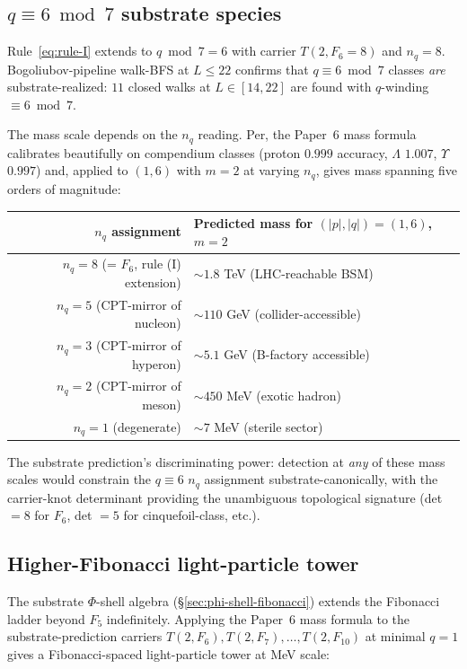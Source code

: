 \documentclass[11pt]{article}
\begin{document}
\subsection{$q \equiv 6 \bmod 7$ substrate species}
\label{sec:q6-species}

Rule~\eqref{eq:rule-I} extends to $q \bmod 7 = 6$ with carrier $T(2, F_6 = 8)$ and $n_q = 8$.  Bogoliubov-pipeline walk-BFS at $L \leq 22$ confirms that $q \equiv 6 \bmod 7$ classes \emph{are} substrate-realized: $11$ closed walks at $L \in [14, 22]$ are found with $q$-winding $\equiv 6 \bmod 7$.

The mass scale depends on the $n_q$ reading.  Per, the Paper~6 mass formula calibrates beautifully on compendium classes (proton $0.999$ accuracy, $\Lambda$ $1.007$, $\Upsilon$ $0.997$) and, applied to $(1, 6)$ with $m = 2$ at varying $n_q$, gives mass spanning five orders of magnitude:
\begin{center}
\begin{tabular}{rl}
\toprule
$n_q$ assignment & Predicted mass for $(|p|, |q|) = (1, 6)$, $m = 2$ \\
\midrule
$n_q = 8$ (= $F_6$, rule (I) extension) & $\sim 1.8$ TeV (LHC-reachable BSM) \\
$n_q = 5$ (CPT-mirror of nucleon)        & $\sim 110$ GeV (collider-accessible) \\
$n_q = 3$ (CPT-mirror of hyperon)        & $\sim 5.1$ GeV (B-factory accessible) \\
$n_q = 2$ (CPT-mirror of meson)          & $\sim 450$ MeV (exotic hadron) \\
$n_q = 1$ (degenerate)                   & $\sim 7$ MeV (sterile sector) \\
\bottomrule
\end{tabular}
\end{center}

The substrate prediction's discriminating power: detection at \emph{any} of these mass scales would constrain the $q \equiv 6$ $n_q$ assignment substrate-canonically, with the carrier-knot determinant providing the unambiguous topological signature (det $= 8$ for $F_6$, det $= 5$ for cinquefoil-class, etc.).

\subsection{Higher-Fibonacci light-particle tower}
\label{sec:fibonacci-tower}

The substrate $\Phi$-shell algebra (\S\ref{sec:phi-shell-fibonacci}) extends the Fibonacci ladder beyond $F_5$ indefinitely.  Applying the Paper~6 mass formula to the substrate-prediction carriers $T(2, F_6), T(2, F_7), \ldots, T(2, F_{10})$ at minimal $q = 1$ gives a Fibonacci-spaced light-particle tower at MeV scale:
\end{document}
